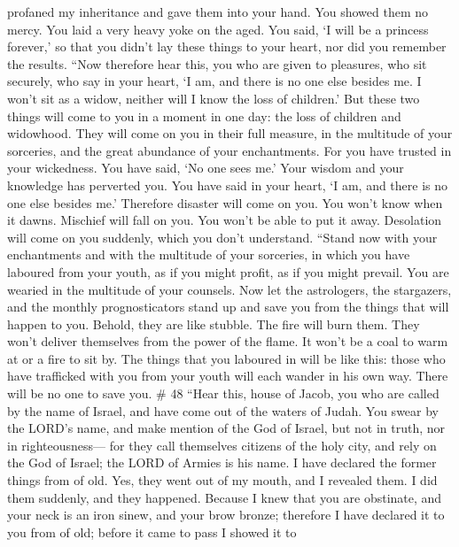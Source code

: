 profaned my inheritance and gave them into your hand. You showed them no
mercy. You laid a very heavy yoke on the aged.  You said,
`I will be a princess forever,' so that you didn't lay these things to
your heart, nor did you remember the results.  ``Now
therefore hear this, you who are given to pleasures, who sit securely,
who say in your heart, `I am, and there is no one else besides me. I
won't sit as a widow, neither will I know the loss of children.'
 But these two things will come to you in a moment in one
day: the loss of children and widowhood. They will come on you in their
full measure, in the multitude of your sorceries, and the great
abundance of your enchantments.  For you have trusted in
your wickedness. You have said, `No one sees me.' Your wisdom and your
knowledge has perverted you. You have said in your heart, `I am, and
there is no one else besides me.'  Therefore disaster
will come on you. You won't know when it dawns. Mischief will fall on
you. You won't be able to put it away. Desolation will come on you
suddenly, which you don't understand.  ``Stand now with
your enchantments and with the multitude of your sorceries, in which you
have laboured from your youth, as if you might profit, as if you might
prevail.  You are wearied in the multitude of your
counsels. Now let the astrologers, the stargazers, and the monthly
prognosticators stand up and save you from the things that will happen
to you.  Behold, they are like stubble. The fire will
burn them. They won't deliver themselves from the power of the flame. It
won't be a coal to warm at or a fire to sit by.  The
things that you laboured in will be like this: those who have trafficked
with you from your youth will each wander in his own way. There will be
no one to save you. \# 48  ``Hear this, house of Jacob,
you who are called by the name of Israel, and have come out of the
waters of Judah. You swear by the LORD's name, and make mention of the
God of Israel, but not in truth, nor in righteousness--- 
for they call themselves citizens of the holy city, and rely on the God
of Israel; the LORD of Armies is his name.  I have
declared the former things from of old. Yes, they went out of my mouth,
and I revealed them. I did them suddenly, and they happened.
 Because I knew that you are obstinate, and your neck is
an iron sinew, and your brow bronze;  therefore I have
declared it to you from of old; before it came to pass I showed it to
